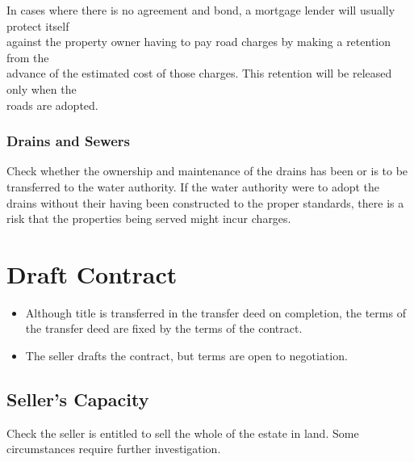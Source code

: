 \documentclass[
]{article}
\providecommand{\tightlist}{%
  \setlength{\itemsep}{0pt}\setlength{\parskip}{0pt}}
\begin{document}
In cases where there is no agreement and bond, a mortgage lender will
usually protect itself\\
against the property owner having to pay road charges by making a
retention from the\\
advance of the estimated cost of those charges. This retention will be
released only when the\\
roads are adopted.

\hypertarget{drains-and-sewers}{%
\subsubsection{Drains and Sewers}\label{drains-and-sewers}}

Check whether the ownership and maintenance of the drains has been or is
to be transferred to the water authority. If the water authority were to
adopt the drains without their having been constructed to the proper
standards, there is a risk that the properties being served might incur
charges.

\hypertarget{draft-contract}{%
\section{Draft Contract}\label{draft-contract}}

\begin{itemize}
\tightlist
\item
  Although title is transferred in the transfer deed on completion, the
  terms of the transfer deed are fixed by the terms of the contract.
\item
  The seller drafts the contract, but terms are open to negotiation.
\end{itemize}

\hypertarget{sellers-capacity}{%
\subsection{Seller's Capacity}\label{sellers-capacity}}

Check the seller is entitled to sell the whole of the estate in land.
Some circumstances require further investigation.
\end{document}
